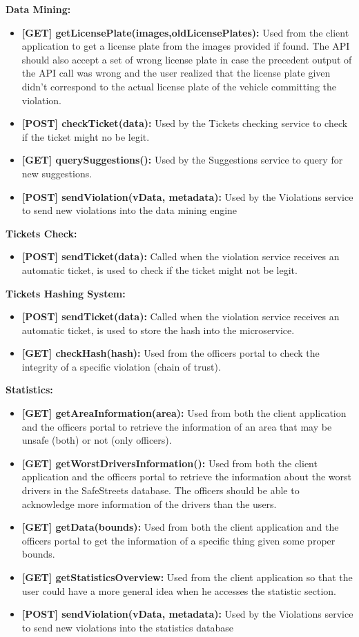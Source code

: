 \textbf{Data Mining:}
\begin{itemize}
	\item \textbf{[GET] getLicensePlate(images,oldLicensePlates):} Used from the client application to get a license plate from the images provided if found. The API should also accept a set of wrong license plate in case the precedent output of the API call was wrong and the user realized that the license plate given didn't correspond to the actual license plate of the vehicle committing the violation.
	\item \textbf{[POST] checkTicket(data):} Used by the Tickets checking service to check if the ticket might no be legit.
	\item \textbf{[GET] querySuggestions():} Used by the Suggestions service to query for new suggestions.
	\item \textbf{[POST] sendViolation(vData, metadata):} Used by the Violations service to send new violations into the data mining engine
\end{itemize}

\textbf{Tickets Check:}
\begin{itemize}
	\item \textbf{[POST] sendTicket(data):} Called when the violation service receives an automatic ticket, is used to check if the ticket might not be legit.
\end{itemize}

\textbf{Tickets Hashing System:}
\begin{itemize}
	\item \textbf{[POST] sendTicket(data):} Called when the violation service receives an automatic ticket, is used to store the hash into the microservice.
	\item \textbf{[GET] checkHash(hash):}  Used from the officers portal to check the integrity of a specific violation (chain of trust). 
\end{itemize}

\textbf{Statistics:}
\begin{itemize}
	\item \textbf{[GET] getAreaInformation(area):} Used from both the client application and the officers portal to retrieve the information of an area that may be unsafe (both) or not (only officers).
	\item \textbf{[GET] getWorstDriversInformation():} Used from both the client application and the officers portal to retrieve the information about the worst drivers in the SafeStreets database. The officers should be able to acknowledge more information of the drivers than the users.
	\item \textbf{[GET] getData(bounds):} Used from both the client application and the officers portal to get the information of a specific thing given some proper bounds.
	\item \textbf{[GET] getStatisticsOverview:} Used from the client application so that the user could have a more general idea when he accesses the statistic section.
	\item \textbf{[POST] sendViolation(vData, metadata):} Used by the Violations service to send new violations into the statistics database
\end{itemize}

